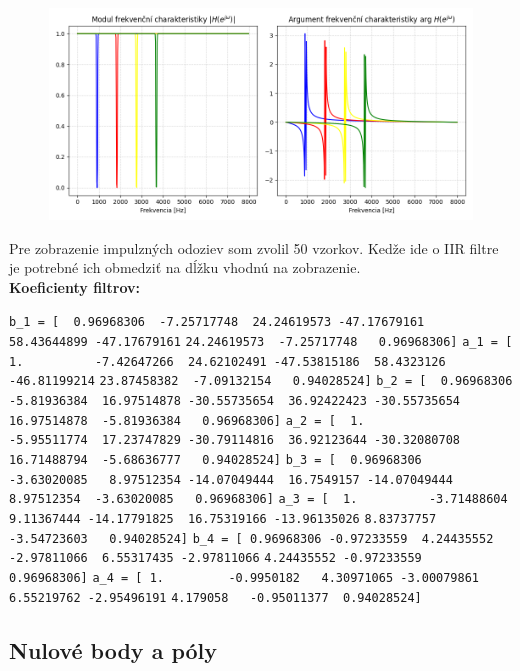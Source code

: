 \documentclass[a4paper,oneside]{article}
\begin{document}
	\begin{figure}[h]
	    \begin{center}
		    \includegraphics[width=12cm,keepaspectratio]{uloha4-7.png}
		\end{center}
	\end{figure}
	
	Pre zobrazenie impulzných odoziev som zvolil 50 vzorkov. Kedže ide o IIR filtre je potrebné ich obmedziť na dĺžku vhodnú na zobrazenie. \\
	
	\textbf{Koeficienty filtrov:}
	\begin{center}
	    \verb|b_1 = [  0.96968306  -7.25717748  24.24619573 -47.17679161  58.43644899 -47.17679161|
	    \verb|24.24619573  -7.25717748   0.96968306]|
    	\verb|a_1 = [  1.          -7.42647266  24.62102491 -47.53815186  58.4323126 -46.81199214|
    	\verb|23.87458382  -7.09132154   0.94028524]|
        \verb|b_2 = [  0.96968306  -5.81936384  16.97514878 -30.55735654  36.92422423 -30.55735654|
        \verb|16.97514878  -5.81936384   0.96968306]|
        \verb|a_2 = [  1.          -5.95511774  17.23747829 -30.79114816  36.92123644 -30.32080708|
        \verb|16.71488794  -5.68636777   0.94028524]|
        \verb|b_3 = [  0.96968306  -3.63020085   8.97512354 -14.07049444  16.7549157 -14.07049444|
        \verb|8.97512354  -3.63020085   0.96968306]|
        \verb|a_3 = [  1.          -3.71488604   9.11367444 -14.17791825  16.75319166 -13.96135026|
        \verb|8.83737757  -3.54723603   0.94028524]|
        \verb|b_4 = [ 0.96968306 -0.97233559  4.24435552 -2.97811066  6.55317435 -2.97811066|
        \verb|4.24435552 -0.97233559  0.96968306]|
        \verb|a_4 = [ 1.         -0.9950182   4.30971065 -3.00079861  6.55219762 -2.95496191|
        \verb|4.179058   -0.95011377  0.94028524]|
    \end{center}

	
	\subsection{Nulové body a póly}
	
\end{document}
